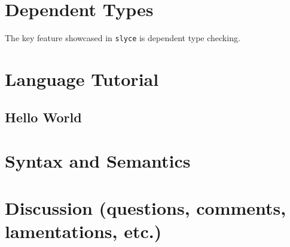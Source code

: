 


\section{Dependent Types}
The key feature showcased in \texttt{slyce} is dependent type checking. 

\section{Language Tutorial}
\subsection{Hello World}
\section{Syntax and Semantics}





\section{Discussion (questions, comments, lamentations, etc.)}

